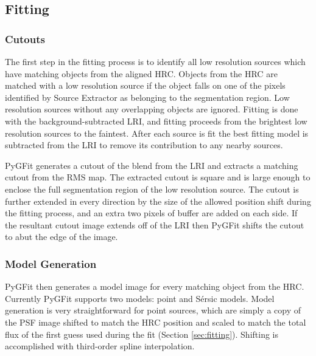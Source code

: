 \documentclass[apj]{emulateapj}
\newcommand{\sersic}{S\'{e}rsic}
\newcommand{\pygfit}{PyGFit}
\newcommand{\extractor}{Source Extractor}
\begin{document}

\subsection{Fitting}\label{sec:fitting_procedure}

\subsubsection{Cutouts}

The first step in the fitting process is to identify all low resolution sources which have matching objects from the aligned HRC.  Objects from the HRC are matched with a low resolution source if the object falls on one of the pixels identified by \extractor{} as belonging to the segmentation region.  Low resolution sources without any overlapping objects are ignored.  Fitting is done with the background-subtracted LRI, and fitting proceeds from the brightest low resolution sources to the faintest.  After each source is fit the best fitting model is subtracted from the LRI to remove its contribution to any nearby sources.

\pygfit{} generates a cutout of the blend from the LRI and extracts a matching cutout from the RMS map.  The extracted cutout is square and is large enough to enclose the full segmentation region of the low resolution source.  The cutout is further extended in every direction by the size of the allowed position shift during the fitting process, and an extra two pixels of buffer are added on each side.  If the resultant cutout image extends off of the LRI then \pygfit{} shifts the cutout to abut the edge of the image.

\subsubsection{Model Generation}\label{sec:modeling}

\pygfit{} then generates a model image for every matching object from the HRC.  Currently \pygfit{} supports two models: point and \sersic{} models.  Model generation is very straightforward for point sources, which are simply a copy of the PSF image shifted to match the HRC position and scaled to match the total flux of the first guess used during the fit (Section \ref{sec:fitting}).  Shifting is accomplished with third-order spline interpolation.
\end{document}
